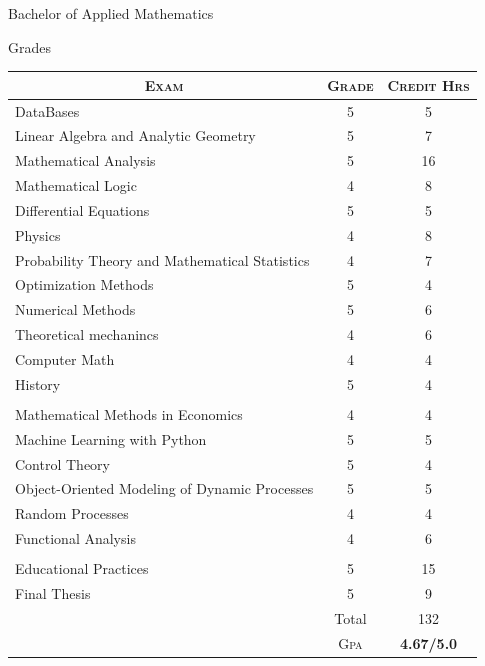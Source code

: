 \documentclass[a4paper,10pt]{article} %
\begin{document}

\newpage


\par{\centering\Large \hypertarget{grds}{Bachelor of Applied Mathematics}\par}\large{\centering Grades\par}\normalsize

\begin{center}
\begin{tabular}{lcc}
\multicolumn{1}{c}{\textsc{Exam}} & \textsc{Grade}&\textsc{Credit Hrs}\\ \hline
DataBases & 5 & 5\\
Linear Algebra and Analytic Geometry & 5 & 7\\
Mathematical Analysis & 5 & 16\\
Mathematical Logic & 4 & 8\\
Differential Equations & 5 & 5\\
Physics	& 4 & 8\\	
Probability Theory and Mathematical Statistics & 4 & 7\\
Optimization Methods & 5 & 4\\
Numerical Methods & 5 & 6\\
Theoretical mechanincs & 4 & 6\\
Computer Math & 4 & 4\\
History & 5 &	4\\ \\

Mathematical Methods in Economics & 4 & 4\\
Machine Learning with Python & 5 & 5\\
Control Theory & 5 & 4\\
Object-Oriented Modeling of Dynamic Processes & 5 & 5\\
Random Processes & 4 & 4\\
Functional Analysis	 & 4 & 6\\ \\

Educational Practices & 5 & 15\\		
Final Thesis & 5 & 9\\	
& Total & 132\\\cline{2-3}
&\textsc{Gpa}&\textbf{4.67/5.0}
\end{tabular}
\end{center}
\end{document}
